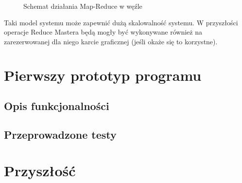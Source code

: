 \documentclass[paper=a4, fontsize=11pt]{scrartcl} %
\numberwithin{equation}{section} %
\numberwithin{figure}{section} %
\numberwithin{table}{section} %
\begin{document}
\begin{itemize}
		\begin{figure}[t]
			\begin{center}
				\caption{Schemat działania Map-Reduce w węźle}
			\end{center}
		\end{figure}
\end{itemize}
\clearpage

Taki model systemu może zapewnić dużą skalowalność systemu. W przyszłości operacje Reduce Mastera będą mogły być wykonywane również na zarezerwowanej dla niego karcie graficznej (jeśli okaże się to korzystne).

\section{Pierwszy prototyp programu}
	\subsection{Opis funkcjonalności}
	\subsection{Przeprowadzone testy}

\section{Przyszłość}
\end{document}
